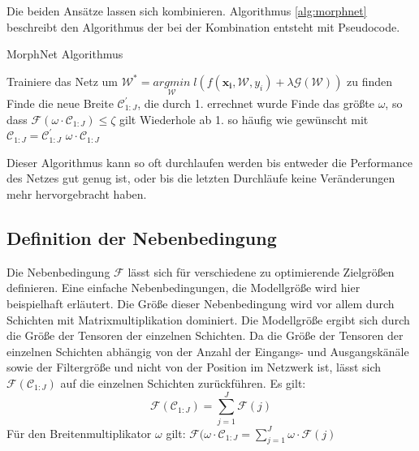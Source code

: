 Die beiden Ansätze lassen sich kombinieren. Algorithmus \ref{alg:morphnet} beschreibt den Algorithmus der bei der Kombination entsteht mit Pseudocode.
\begin{algorithm}[H]
\caption{MorphNet Algorithmus}
\begin{algorithmic}[1]
\STATE Trainiere das Netz um $\mathcal{W}^{\ast}=\underset{\mathcal{W}}{arg min}\; l(f(\mathbf{x_i}, \mathcal{W},y_i) + \lambda \mathcal{G}(\mathcal{W}))$ zu finden
\STATE Finde die neue Breite $\mathcal{C}_{1:J}^{\prime}$, die durch 1. errechnet wurde
\STATE Finde das größte $\omega$, so dass $\mathcal{F}(\omega \cdot \mathcal{C}_{1:J})\leq \zeta$ gilt
\STATE Wiederhole ab 1. so häufig wie gewünscht mit $\mathcal{C}_{1:J} = \mathcal{C}_{1:J}^{\prime}$
\ENSURE $\omega \cdot \mathcal{C}_{1:J}$
\end{algorithmic}
\label{alg:morphnet}
\end{algorithm}
Dieser Algorithmus kann so oft durchlaufen werden bis entweder die Performance des Netzes gut genug ist, oder bis die letzten Durchläufe keine Veränderungen mehr hervorgebracht haben.


\subsection{Definition der Nebenbedingung}
Die Nebenbedingung $\mathcal{F}$ lässt sich für verschiedene zu optimierende Zielgrößen definieren. Eine einfache Nebenbedingungen, die Modellgröße wird hier beispielhaft erläutert. Die Größe dieser Nebenbedingung wird vor allem durch Schichten mit Matrixmultiplikation dominiert. Die Modellgröße ergibt sich durch die Größe der Tensoren der einzelnen Schichten. Da die Größe der Tensoren der einzelnen Schichten abhängig von der Anzahl der Eingangs- und Ausgangskänäle sowie der Filtergröße und nicht von der Position im Netzwerk ist, lässt sich $\mathcal{F}(\mathcal{C}_{1:J})$ auf die einzelnen Schichten zurückführen. Es gilt:
\begin{equation}
 \mathcal{F}(\mathcal{C}_{1:J})=\sum_{j=1}^{J} \mathcal{F}(j)
\end{equation}
Für den Breitenmultiplikator $\omega$ gilt: $\mathcal{F}(\omega \cdot \mathcal{C}_{1:J}=\sum_{j=1}^{J} \omega \cdot \mathcal{F}(j)$

